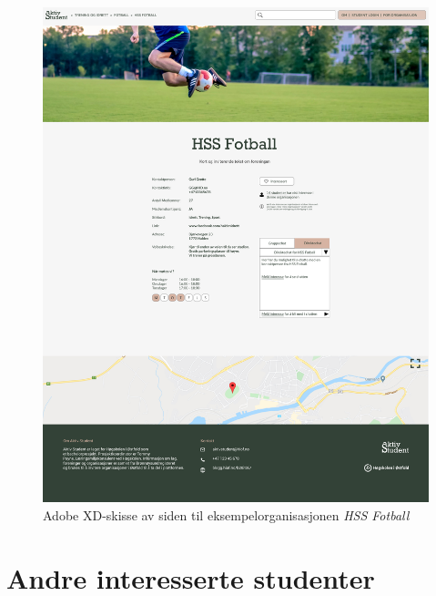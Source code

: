 \begin{figure}[H]
\centering
\includegraphics[width=\textwidth]{Illustrasjoner/Skisser-pdf/3.0/3-4-organisasjonsside.pdf}
\caption{Adobe XD-skisse av siden til eksempelorganisasjonen {\em HSS Fotball}}
\label{vedlegg:3-4-org-side}
\end{figure}

\section{Andre interesserte studenter}

